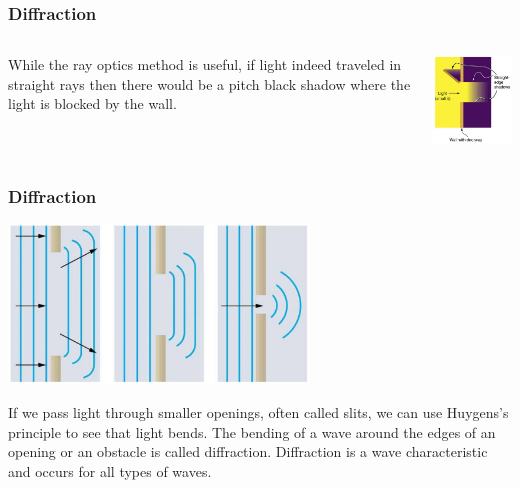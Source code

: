 \documentclass{beamer}
\begin{document}
\begin{frame}\frametitle{Diffraction}
\begin{columns}
\begin{column}{6cm}
While the ray optics method is useful, if light indeed traveled in straight rays then there would be a pitch black shadow where the light is blocked by the wall.
\end{column}
\begin{column}{5cm}
\begin{center}
\includegraphics[width=5cm]{fig/doorway.jpg}
\end{center}
\end{column}
\end{columns}
\end{frame}

\begin{frame}\frametitle{Diffraction}
\begin{center}
\includegraphics[width=8cm]{fig/diffraction.jpg}
\end{center}

If we pass light through smaller openings, often called slits, we can use Huygens’s principle to see that light bends. The bending of a wave around the edges of an opening or an obstacle is called diffraction. Diffraction is a wave characteristic and occurs for all types of waves.
\end{frame}
\end{document}
